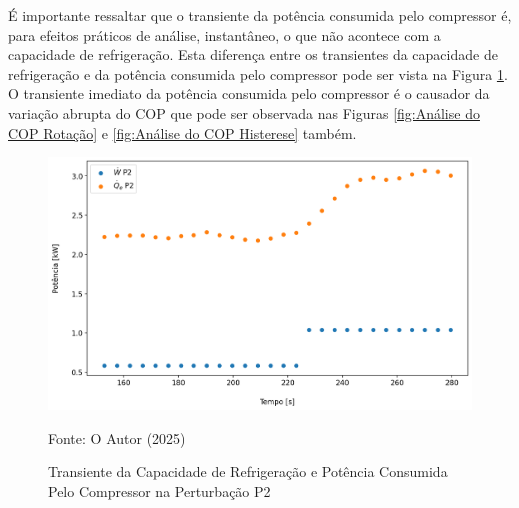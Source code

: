 É importante ressaltar que o transiente da potência consumida pelo compressor é, para efeitos práticos de análise, instantâneo, o que não acontece com a capacidade de refrigeração. Esta diferença entre os transientes da capacidade de refrigeração e da potência consumida pelo compressor pode ser vista na Figura \ref{fig:zoom capapcidade de refrigeração e potência de consumo}. O transiente imediato da potência consumida pelo compressor é o causador da variação abrupta do COP que pode ser observada nas Figuras \ref{fig:Análise do COP Rotação} e \ref{fig:Análise do COP Histerese} também. 
\newpage
\begin{figure}[h]
    \centering
    \includegraphics[width=1\linewidth]{FigurasdoTexto/Zoom Capacidade de Refrigeração e Potência de Consumo.png}
    \caption{Transiente da Capacidade de Refrigeração e Potência Consumida Pelo Compressor na Perturbação P2}
    \label{fig:zoom capapcidade de refrigeração e potência de consumo}
    {\footnotesize Fonte: O Autor (2025)}
\end{figure} 

